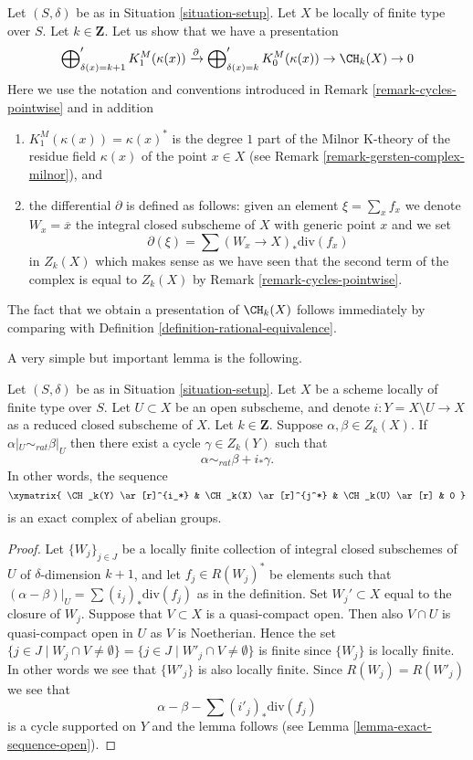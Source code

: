 \begin{remark}
\label{remark-chow-group-pointwise}
Let $(S, \delta)$ be as in Situation \ref{situation-setup}.
Let $X$ be locally of finite type over $S$. Let $k \in \mathbf{Z}$.
Let us show that we have a presentation
$$
\bigoplus\nolimits_{\delta(x) = k + 1}' K_1^M(\kappa(x))
\xrightarrow{\partial}
\bigoplus\nolimits_{\delta(x) = k}' K_0^M(\kappa(x)) \to
\CH_k(X) \to 0
$$
Here we use the notation and conventions introduced in
Remark \ref{remark-cycles-pointwise} and in addition
\begin{enumerate}
\item $K_1^M(\kappa(x)) = \kappa(x)^*$ is the degree $1$ part of
the Milnor K-theory of the residue field $\kappa(x)$ of the point
$x \in X$ (see Remark \ref{remark-gersten-complex-milnor}), and
\item the differential $\partial$ is defined as follows:
given an element $\xi = \sum_x f_x$ we denote $W_x = \overline{x}$
the integral closed subscheme of $X$ with generic point $x$ and we set
$$
\partial(\xi) = \sum (W_x \to X)_*\text{div}(f_x)
$$
in $Z_k(X)$ which makes sense as we have seen that the second
term of the complex is equal to $Z_k(X)$ by
Remark \ref{remark-cycles-pointwise}.
\end{enumerate}
The fact that we obtain a presentation of $\CH_k(X)$ follows
immediately by comparing with Definition \ref{definition-rational-equivalence}.
\end{remark}

\noindent
A very simple but important lemma is the following.

\begin{lemma}
\label{lemma-restrict-to-open}
Let $(S, \delta)$ be as in Situation \ref{situation-setup}.
Let $X$ be a scheme locally of finite type over $S$.
Let $U \subset X$ be an open subscheme, and denote
$i : Y = X \setminus U \to X$ as a reduced closed subscheme of $X$.
Let $k \in \mathbf{Z}$.
Suppose $\alpha, \beta \in Z_k(X)$.
If $\alpha|_U \sim_{rat} \beta|_U$ then there exist a cycle
$\gamma \in Z_k(Y)$ such that
$$
\alpha \sim_{rat} \beta + i_*\gamma.
$$
In other words, the sequence
$$
\xymatrix{
\CH_k(Y) \ar[r]^{i_*} & \CH_k(X) \ar[r]^{j^*} & \CH_k(U) \ar[r] & 0
}
$$
is an exact complex of abelian groups.
\end{lemma}

\begin{proof}
Let $\{W_j\}_{j \in J}$ be a locally finite collection of integral closed
subschemes of $U$ of $\delta$-dimension $k + 1$, and let $f_j \in R(W_j)^*$
be elements such that $(\alpha - \beta)|_U = \sum (i_j)_*\text{div}(f_j)$
as in the definition. Set $W_j' \subset X$ equal
to the closure of $W_j$. Suppose that $V \subset X$ is a quasi-compact
open. Then also $V \cap U$ is quasi-compact open in $U$ as
$V$ is Noetherian. Hence the set
$\{j \in J \mid W_j \cap V \not = \emptyset\}
= \{j \in J \mid W'_j \cap V \not = \emptyset\}$
is finite since $\{W_j\}$ is locally finite. In other words we see that
$\{W'_j\}$ is also locally finite. Since $R(W_j) = R(W'_j)$ we see
that
$$
\alpha - \beta - \sum (i'_j)_*\text{div}(f_j)
$$
is a cycle supported on $Y$ and the lemma follows (see
Lemma \ref{lemma-exact-sequence-open}).
\end{proof}

